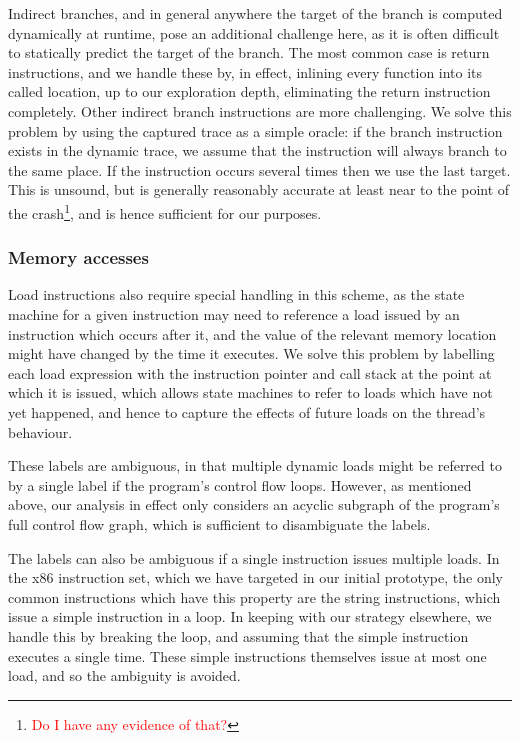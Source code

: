 \documentclass[10pt,twocolumn,preprint,natbib,authoryear]{sigplanconf}
\newcommand{\editorial}[1]{\textcolor{red}{\footnote{\textcolor{red}{#1}}}}
\begin{document}
Indirect branches, and in general anywhere the target of the branch is
computed dynamically at runtime, pose an additional challenge here, as
it is often difficult to statically predict the target of the branch.
The most common case is return instructions, and we handle these by,
in effect, inlining every function into its called location, up to our
exploration depth, eliminating the return instruction completely.
Other indirect branch instructions are more challenging.  We solve
this problem by using the captured trace as a simple oracle: if the
branch instruction exists in the dynamic trace, we assume that the
instruction will always branch to the same place.  If the instruction
occurs several times then we use the last target.  This is unsound,
but is generally reasonably accurate at least near to the point of the
crash\editorial{Do I have any evidence of that?}, and is hence
sufficient for our purposes.

\subsubsection{Memory accesses}

Load instructions also require special handling in this scheme, as the
state machine for a given instruction may need to reference a load
issued by an instruction which occurs after it, and the value of the
relevant memory location might have changed by the time it executes.
We solve this problem by labelling each load expression with the
instruction pointer and call stack at the point at which it is issued,
which allows state machines to refer to loads which have not yet
happened, and hence to capture the effects of future loads on the
thread's behaviour.

These labels are ambiguous, in that multiple dynamic loads might be
referred to by a single label if the program's control flow loops.
However, as mentioned above, our analysis in effect only considers an
acyclic subgraph of the program's full control flow graph, which is
sufficient to disambiguate the labels.

The labels can also be ambiguous if a single instruction issues
multiple loads.  In the x86 instruction set, which we have targeted in
our initial prototype, the only common instructions which have this
property are the string instructions, which issue a simple instruction
in a loop.  In keeping with our strategy elsewhere, we handle this by
breaking the loop, and assuming that the simple instruction executes a
single time.  These simple instructions themselves issue at most one
load, and so the ambiguity is avoided.
\end{document}
